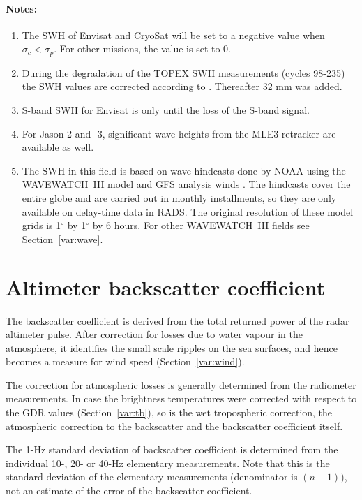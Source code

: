 \documentclass[a4paper,11pt,openany,natbib,nomargin]{thesis}
\renewcommand\deg{\ensuremath{^\circ}}
\newenvironment{notes}[1][Notes:]{\FloatBarrier\paragraph{#1}\begin{enumerate}}{\end{enumerate}}
\begin{document}
\begin{notes}
\item The SWH of Envisat and CryoSat will be set to a negative value when $\sigma_c<\sigma_p$. For other missions, the value is set to 0.\label{item:swh_1}
\item During the degradation of the TOPEX SWH measurements (cycles 98-235) the SWH values are corrected according to \citet{queffeulou2004}. Thereafter 32 mm was added.\label{item:swh_2}
\item S-band SWH for Envisat is only until the loss of the S-band signal.\label{item:swh_3}
\item For Jason-2 and -3, significant wave heights from the MLE3 retracker are available as well.\label{item:swh_ku_mle3}
\item The SWH in this field is based on wave hindcasts done by NOAA using the WAVEWATCH~III model \citep{tolman2009} and GFS analysis winds \citep{chawla2011}. The hindcasts cover the entire globe and are carried out in monthly installments, so they are only available on delay-time data in RADS. The original resolution of these model grids is 1$\deg$ by 1$\deg$ by 6 hours. For other WAVEWATCH~III fields see Section~\ref{var:wave}.\label{item:swh_ww3}
\end{notes}

\section{Altimeter backscatter coefficient}
\label{var:sig0}
The backscatter coefficient is derived from the total returned power of the radar altimeter pulse. After correction for losses due to water vapour in the atmosphere, it identifies the small scale ripples on the sea surfaces, and hence becomes a measure for wind speed (Section~\ref{var:wind}).

The correction for atmospheric losses is generally determined from the radiometer measurements. In case the brightness temperatures were corrected with respect to the GDR values (Section~\ref{var:tb}), so is the wet tropospheric correction, the atmospheric correction to the backscatter and the backscatter coefficient itself.

The 1-Hz standard deviation of backscatter coefficient is determined from the individual 10-, 20- or 40-Hz elementary measurements. Note that this is the standard deviation of the elementary measurements (denominator is $(n-1)$), not an estimate of the error of the backscatter coefficient.
\end{document}
